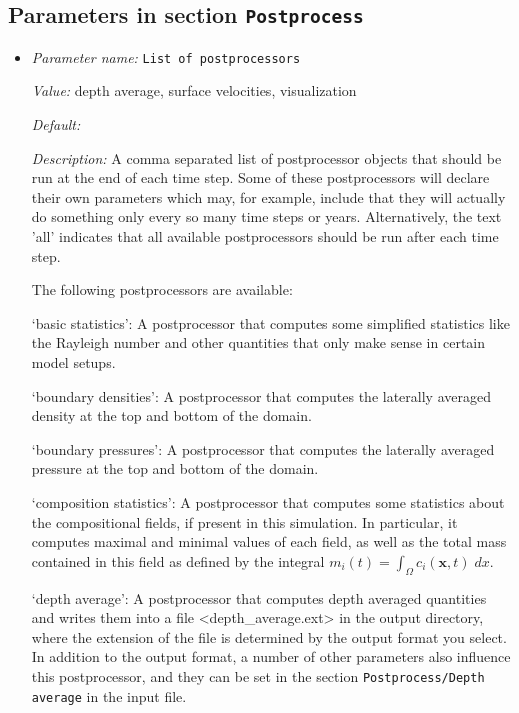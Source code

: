 \subsection{Parameters in section \tt Postprocess}
\label{parameters:Postprocess}

\begin{itemize}
\item {\it Parameter name:} {\tt List of postprocessors}
\label{parameters:Postprocess/List of postprocessors}


{\it Value:} depth average, surface velocities, visualization


{\it Default:} 


{\it Description:} A comma separated list of postprocessor objects that should be run at the end of each time step. Some of these postprocessors will declare their own parameters which may, for example, include that they will actually do something only every so many time steps or years. Alternatively, the text 'all' indicates that all available postprocessors should be run after each time step.

The following postprocessors are available:

`basic statistics': A postprocessor that computes some simplified statistics like the Rayleigh number and other quantities that only make sense in certain model setups.

`boundary densities': A postprocessor that computes the laterally averaged density at the top and bottom of the domain.

`boundary pressures': A postprocessor that computes the laterally averaged pressure at the top and bottom of the domain.

`composition statistics': A postprocessor that computes some statistics about the compositional fields, if present in this simulation. In particular, it computes maximal and minimal values of each field, as well as the total mass contained in this field as defined by the integral $m_i(t) = \int_\Omega c_i(\mathbf x,t) \; dx$.

`depth average': A postprocessor that computes depth averaged quantities and writes them into a file <depth_average.ext> in the output directory, where the extension of the file is determined by the output format you select. In addition to the output format, a number of other parameters also influence this postprocessor, and they can be set in the section \texttt{Postprocess/Depth average} in the input file.


\end{itemize}
